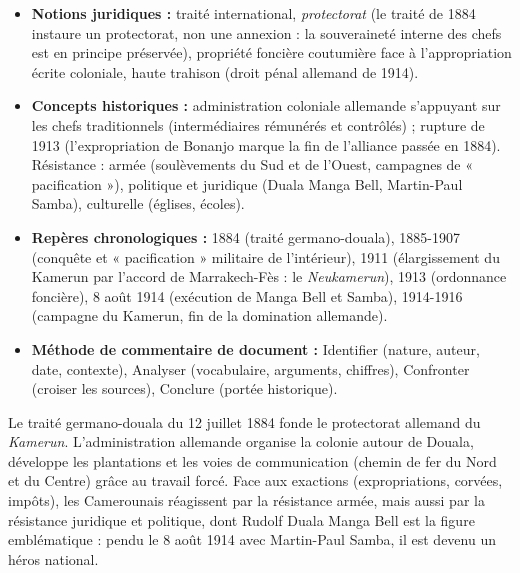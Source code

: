 \documentclass[11pt]{article}
\newcommand{\cle}[1]{{\popxbold\color{popdark}#1}}
\newcounter{popsec}
\newcounter{popsub}
\newcommand{\courssub}[1]{%
  \stepcounter{popsub}%
  \par\vspace{9pt}\noindent{\popxbold\fontsize{11.5}{13}\selectfont\color{popink}{\color{poporange}\thepopsec.\thepopsub}\hspace{6pt}#1}\par\nopagebreak\vspace{4pt}
}
\begin{document}
\courssub{Ressources à mobiliser}
\begin{itemize}
    \item \textbf{Notions juridiques :} traité international, \emph{protectorat} (le traité de 1884 instaure un protectorat, non une annexion : la souveraineté interne des chefs est en principe préservée), propriété foncière coutumière face à l'appropriation écrite coloniale, haute trahison (droit pénal allemand de 1914).
    \item \textbf{Concepts historiques :} administration coloniale allemande s'appuyant sur les chefs traditionnels (intermédiaires rémunérés et contrôlés) ; rupture de 1913 (l'expropriation de Bonanjo marque la fin de l'alliance passée en 1884). \cle{Résistance} : armée (soulèvements du Sud et de l'Ouest, campagnes de « pacification »), politique et juridique (Duala Manga Bell, Martin-Paul Samba), culturelle (églises, écoles).
    \item \textbf{Repères chronologiques :} 1884 (traité germano-douala), 1885-1907 (conquête et « pacification » militaire de l'intérieur), 1911 (élargissement du Kamerun par l'accord de Marrakech-Fès : le \emph{Neukamerun}), 1913 (ordonnance foncière), 8 août 1914 (exécution de Manga Bell et Samba), 1914-1916 (campagne du Kamerun, fin de la domination allemande).
    \item \textbf{Méthode de commentaire de document :} Identifier (nature, auteur, date, contexte), Analyser (vocabulaire, arguments, chiffres), Confronter (croiser les sources), Conclure (portée historique).
\end{itemize}

\begin{aretenir}
Le traité germano-douala du 12 juillet 1884 fonde le protectorat allemand du \emph{Kamerun}. L'administration allemande organise la colonie autour de Douala, développe les plantations et les voies de communication (chemin de fer du Nord et du Centre) grâce au travail forcé. Face aux exactions (expropriations, corvées, impôts), les Camerounais réagissent par la résistance armée, mais aussi par la résistance juridique et politique, dont Rudolf Duala Manga Bell est la figure emblématique : pendu le 8 août 1914 avec Martin-Paul Samba, il est devenu un héros national.
\end{aretenir}
\end{document}
